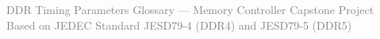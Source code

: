 \documentclass[11pt,a4paper]{article}
\begin{document}
\vfill
\begin{center}
\small\textcolor{gray}{%
DDR Timing Parameters Glossary --- Memory Controller Capstone Project\\
Based on JEDEC Standard JESD79-4 (DDR4) and JESD79-5 (DDR5)
}
\end{center}
\end{document}
